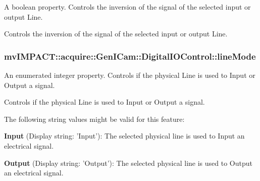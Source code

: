 A boolean property. Controls the inversion of the signal of the selected input or output Line. 

Controls the inversion of the signal of the selected input or output Line. \hypertarget{classmv_i_m_p_a_c_t_1_1acquire_1_1_gen_i_cam_1_1_digital_i_o_control_a29a79ff170f40fe0edf89f93c0d97d2f}{
\subsubsection[{line\+Mode}]{ mv\+I\+M\+P\+A\+C\+T\+::acquire\+::\+Gen\+I\+Cam\+::\+Digital\+I\+O\+Control\+::line\+Mode}}\label{classmv_i_m_p_a_c_t_1_1acquire_1_1_gen_i_cam_1_1_digital_i_o_control_a29a79ff170f40fe0edf89f93c0d97d2f}


An enumerated integer property. Controls if the physical Line is used to Input or Output a signal. 

Controls if the physical Line is used to Input or Output a signal.

The following string values might be valid for this feature\+:
\begin{DoxyItemize}
\item {\bfseries Input} (Display string\+: 'Input')\+: The selected physical line is used to Input an electrical signal.
\item {\bfseries Output} (Display string\+: 'Output')\+: The selected physical line is used to Output an electrical signal.
\end{DoxyItemize}

